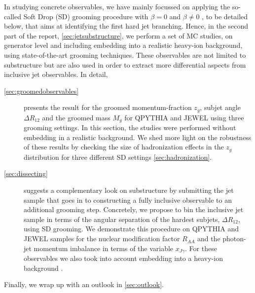 In studying concrete observables, we have mainly focussed on applying the so-called Soft Drop (SD) grooming procedure with $\beta = 0$ \cite{Dasgupta:2013ihk} and $\beta \neq 0$ \cite{Larkoski:2014wba}, to be detailed below, that aims at identifying the first hard jet branching. 
Hence, in the second part of the report, \autoref{sec:jetsubstructure}, we perform a set of MC studies, on generator level and including embedding into a realistic heavy-ion background, using state-of-the-art grooming techniques. These observables are  not limited to substructure but are also used in order to extract more differential aspects from inclusive jet observables. In detail, 
\begin{description}
\item[\autoref{sec:groomedobservables}] presents the result for the groomed momentum-fraction $z_g$, subjet angle $\Delta R_{12}$ and the groomed mass  $M_g$ for QPYTHIA and JEWEL using three grooming settings. In this section, the studies were performed without embedding in a realistic background. We shed more light on the robustness of these results by checking the size of hadronization effects in the $z_g$ distribution for three different SD settings \autoref{sec:hadronization}. 
\item[\autoref{sec:dissecting}] suggests a complementary look on substructure by submitting the jet sample that goes in to constructing a fully inclusive observable to an additional grooming step. Concretely, we propose to bin the inclusive jet sample in terms of the angular separation of the hardest subjets, $\Delta R_{12}$, using SD grooming. We demonstrate this procedure on QPYTHIA and JEWEL samples for the nuclear modification factor $R_{AA}$ and the photon-jet momentum imbalance in terms of the variable $x_{J\gamma}$. For these observables we also took into account embedding into a heavy-ion background \cite{deBarros:2012ws}.
\end{description}
Finally, we wrap up with an outlook in \autoref{sec:outlook}.



